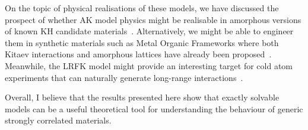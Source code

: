 On the topic of physical realisations of these models, we have discussed the prospect of whether AK model physics might be realisable in amorphous versions of known KH candidate materials~\autocite{TrebstPhysRep2022}. Alternatively, we might be able to engineer them in synthetic materials such as Metal Organic Frameworks where both Kitaev interactions and amorphous lattices have already been proposed~\autocite{yamadaDesigningKitaevSpin2017,bennett2014amorphous}. Meanwhile, the LRFK model might provide an interesting target for cold atom experiments that can naturally generate long-range interactions~\autocite{lepersLongrangeInteractionsUltracold2017}.

Overall, I believe that the results presented here show that exactly solvable models can be a useful theoretical tool for understanding the behaviour of generic strongly correlated materials.
